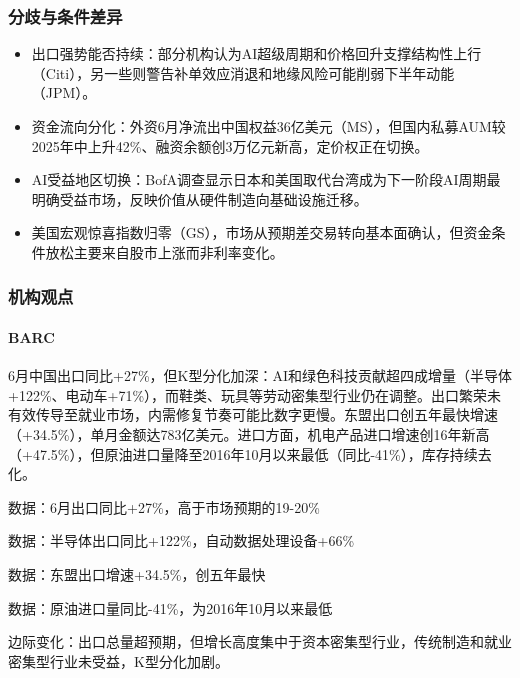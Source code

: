 \documentclass[11pt]{ctexart}
\begin{document}
\subsubsection*{分歧与条件差异}
\begin{itemize}
  \item 出口强势能否持续：部分机构认为AI超级周期和价格回升支撑结构性上行（Citi），另一些则警告补单效应消退和地缘风险可能削弱下半年动能（JPM）。
  \item 资金流向分化：外资6月净流出中国权益36亿美元（MS），但国内私募AUM较2025年中上升42\%、融资余额创3万亿元新高，定价权正在切换。
  \item AI受益地区切换：BofA调查显示日本和美国取代台湾成为下一阶段AI周期最明确受益市场，反映价值从硬件制造向基础设施迁移。
  \item 美国宏观惊喜指数归零（GS），市场从预期差交易转向基本面确认，但资金条件放松主要来自股市上涨而非利率变化。
\end{itemize}
\subsubsection*{机构观点}
\paragraph{BARC} 6月中国出口同比+27\%，但K型分化加深：AI和绿色科技贡献超四成增量（半导体+122\%、电动车+71\%），而鞋类、玩具等劳动密集型行业仍在调整。出口繁荣未有效传导至就业市场，内需修复节奏可能比数字更慢。东盟出口创五年最快增速（+34.5\%），单月金额达783亿美元。进口方面，机电产品进口增速创16年新高（+47.5\%），但原油进口量降至2016年10月以来最低（同比-41\%），库存持续去化。
{\small\color{refgray}数据：6月出口同比+27\%，高于市场预期的19-20\%\par}
{\small\color{refgray}数据：半导体出口同比+122\%，自动数据处理设备+66\%\par}
{\small\color{refgray}数据：东盟出口增速+34.5\%，创五年最快\par}
{\small\color{refgray}数据：原油进口量同比-41\%，为2016年10月以来最低\par}
{\small\color{refgray}边际变化：出口总量超预期，但增长高度集中于资本密集型行业，传统制造和就业密集型行业未受益，K型分化加剧。\par}
\end{document}

